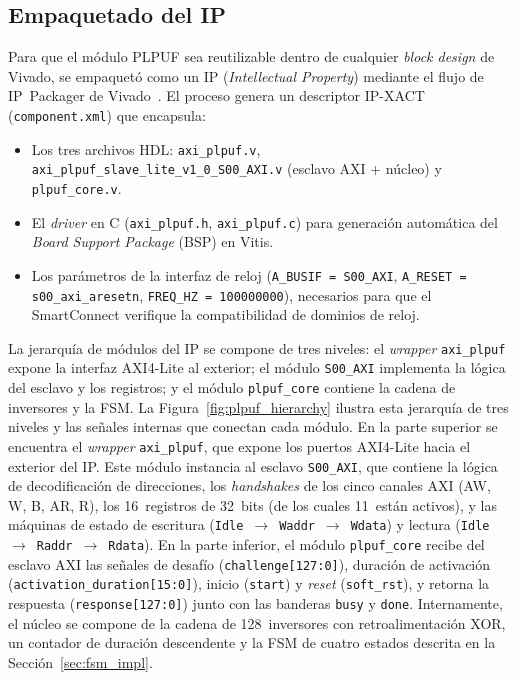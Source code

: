 \subsection{Empaquetado del IP}
\label{sec:ip_packager}

Para que el módulo PLPUF sea reutilizable dentro de cualquier \textit{block
design} de Vivado, se empaquetó como un IP (\textit{Intellectual Property})
mediante el flujo de IP~Packager de Vivado~\cite{ug1037}. El proceso genera
un descriptor IP-XACT (\texttt{component.xml}) que encapsula:

\begin{itemize}
  \item Los tres archivos HDL: \texttt{axi\_plpuf.v}, \texttt{axi\_plpuf\_slave\_lite\_v1\_0\_S00\_AXI.v}
    (esclavo AXI + núcleo) y \texttt{plpuf\_core.v}.
  \item El \textit{driver} en C (\texttt{axi\_plpuf.h}, \texttt{axi\_plpuf.c})
    para generación automática del \textit{Board Support Package} (BSP) en Vitis.
  \item Los parámetros de la interfaz de reloj
    (\texttt{A\_BUSIF\,=\,S00\_AXI},
    \texttt{A\_RESET\,=\,s00\_axi\_aresetn},
    \texttt{FREQ\_HZ\,=\,100000000}), necesarios para que el SmartConnect
    verifique la compatibilidad de dominios de reloj.
\end{itemize}

La jerarquía de módulos del IP se compone de tres niveles: el
\textit{wrapper} \texttt{axi\_plpuf} expone la interfaz AXI4-Lite al
exterior; el módulo \texttt{S00\_AXI} implementa la lógica del esclavo y los
registros; y el módulo \texttt{plpuf\_core} contiene la cadena de inversores
y la FSM. La Figura~\ref{fig:plpuf_hierarchy} ilustra esta jerarquía de
tres niveles y las señales internas que conectan cada módulo. En la parte
superior se encuentra el \textit{wrapper} \texttt{axi\_plpuf}, que expone los
puertos AXI4-Lite hacia el exterior del IP. Este módulo instancia al esclavo
\texttt{S00\_AXI}, que contiene la lógica de decodificación de direcciones,
los \textit{handshakes} de los cinco canales AXI (AW, W, B, AR, R), los
16~registros de 32~bits (de los cuales 11~están activos), y las máquinas de
estado de escritura (\texttt{Idle}~$\rightarrow$~\texttt{Waddr}~$\rightarrow$~\texttt{Wdata}) y lectura
(\texttt{Idle}~$\rightarrow$~\texttt{Raddr}~$\rightarrow$~\texttt{Rdata}). En la parte inferior, el módulo
\texttt{plpuf\_core} recibe del esclavo AXI las señales de desafío
(\texttt{challenge[127:0]}), duración de activación
(\texttt{activation\_duration[15:0]}), inicio (\texttt{start}) y
\textit{reset} (\texttt{soft\_rst}), y retorna la respuesta
(\texttt{response[127:0]}) junto con las banderas \texttt{busy} y
\texttt{done}. Internamente, el núcleo se compone de la cadena de
128~inversores con retroalimentación XOR, un contador de duración descendente
y la FSM de cuatro estados descrita en la Sección~\ref{sec:fsm_impl}.

